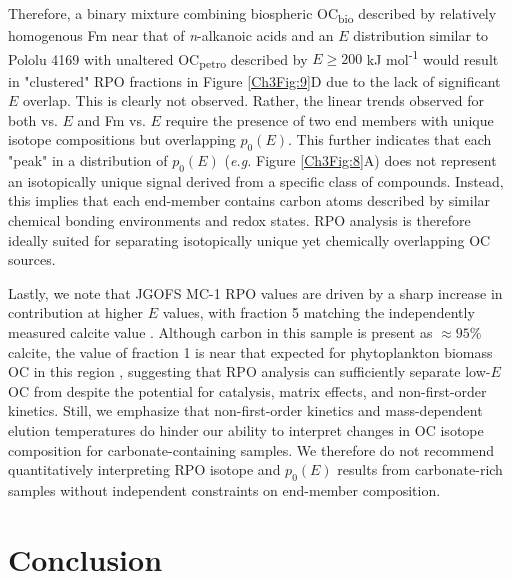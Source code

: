 Therefore, a binary mixture combining biospheric OC\textsubscript{bio} described by relatively homogenous Fm near that of \textit{n}-alkanoic acids and an $E$ distribution similar to Pololu 4169 with unaltered OC\textsubscript{petro} described by $E \geq 200$ kJ mol\textsuperscript{-1} would result in "clustered" RPO fractions in Figure \ref{Ch3Fig:9}D due to the lack of significant $E$ overlap. This is clearly not observed. Rather, the linear trends observed for both  vs. $E$ and Fm vs. $E$ require the presence of two end members with unique isotope compositions but overlapping $p_{0}(E)$. This further indicates that each "peak" in a distribution of $p_{0}(E)$ (\textit{e.g.} Figure \ref{Ch3Fig:8}A) does not represent an isotopically unique signal derived from a specific class of compounds. Instead, this implies that each end-member contains carbon atoms described by similar chemical bonding environments and redox states. RPO analysis is therefore ideally suited for separating isotopically unique yet chemically overlapping OC sources.

Lastly, we note that JGOFS MC-1 RPO  values are driven by a sharp increase in  contribution at higher $E$ values, with fraction 5 matching the independently measured calcite value \citep[Figure \ref{Ch3Fig:9}E;][]{Sayles:2001ua}. Although carbon in this sample is present as $\approx 95$\% calcite, the  value of fraction 1 is near that expected for phytoplankton biomass OC in this region \citep{Rau:1989wr}, suggesting that RPO analysis can sufficiently separate low-$E$ OC from  despite the potential for catalysis, matrix effects, and non-first-order kinetics. Still, we emphasize that non-first-order kinetics and mass-dependent  elution temperatures do hinder our ability to interpret changes in OC isotope composition for carbonate-containing samples. We therefore do not recommend quantitatively interpreting RPO isotope and $p_{0}(E)$ results from carbonate-rich samples without independent constraints on end-member composition. 

\section{Conclusion}

